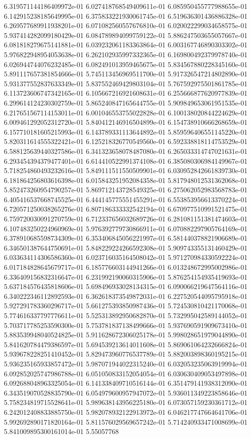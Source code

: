 	6.319571144186409972e-01	6.027418768549409611e-01	6.085950455777988655e-01	6.142915238185649995e-01	6.375833221930061745e-01	6.519636301436886328e-01	6.269577689911938201e-01	6.071082560557676810e-01	6.020022299034658575e-01	5.937414282099180429e-01	6.084789894099759122e-01	5.886247503655057667e-01	6.081818279675141881e-01	6.039232061183363864e-01	6.003167746890303302e-01	5.976822948954053638e-01	6.262102935997332365e-01	6.169800492379978740e-01	6.026944744076232485e-01	6.082491013959465675e-01	5.834567880228345160e-01	5.891117657381854666e-01	5.745113456969511700e-01	5.917326547214802890e-01	5.931377552837633349e-01	5.837552469429803104e-01	5.767592975501861785e-01	6.113723606747342165e-01	6.105667216921608631e-01	6.255666877620977839e-01	6.299614124230302759e-01	5.865240847165644755e-01	5.909849653061951535e-01	6.217651567114153011e-01	6.001046553755022828e-01	6.100138020844224629e-01	6.009461292052312720e-01	5.840412146916504899e-01	6.154738910666268659e-01	6.157710181605215993e-01	6.143789331113644892e-01	5.859596406551145220e-01	5.820311614555322421e-01	6.125218326770549560e-01	6.592338818114753529e-01	6.588125639440327586e-01	6.341323658078487080e-01	6.265033314747021631e-01	6.293454394379477401e-01	6.614410522991374108e-01	6.385080306984149967e-01	5.718254860493232616e-01	5.849111511550509901e-01	6.030952842661839730e-01	6.181864256803616398e-01	6.015843251952084358e-01	5.817948012531362068e-01	5.852473260954790257e-01	5.869712143728549325e-01	6.275062052983568783e-01	6.405416537668745525e-01	6.444145775551455291e-01	6.553853956613370224e-01	6.720571250038265276e-01	6.807186333332542194e-01	6.670977510991521475e-01	6.759720030091270759e-01	6.712337656032689726e-01	6.281081151381474603e-01	6.107483250224960969e-01	5.976392779730866911e-01	6.070882297905764169e-01	6.378910685598734309e-01	6.353406845056221997e-01	6.581440378821906689e-01	6.346501387644750691e-01	5.848229224266592308e-01	5.909743355131460429e-01	6.033634114306586360e-01	6.023716035164508042e-01	5.971270984330592224e-01	6.017184828645679717e-01	6.185776603144941266e-01	6.013248672995002986e-01	6.336409156832316647e-01	6.231992190060315906e-01	5.876254154935419693e-01	5.637184576435818606e-01	5.698496933028134315e-01	6.090066219647564116e-01	6.340222346112892593e-01	6.362618373549872031e-01	6.227520544095795918e-01	5.927291783360296717e-01	5.661275393850987436e-01	5.724530810421170068e-01	5.774616337797776611e-01	5.525313892950682870e-01	5.732995042589144052e-01	5.703717785253590300e-01	5.753781837138499666e-01	5.937690591909673410e-01	5.883539948040524825e-01	5.911628672306025178e-01	5.998028651979044890e-01	5.841620784479386597e-01	5.694539213614011608e-01	5.869061064232666824e-01	5.939678228251410452e-01	5.829473960776537789e-01	5.882003898360195215e-01	5.936235165933857472e-01	5.987071944022315240e-01	6.032053235063919994e-01	6.092852025747986788e-01	6.051050833152054054e-01	6.030630409053497898e-01	6.092688048963325054e-01	6.141338409710516144e-01	6.351479141938312090e-01	6.343519070528835790e-01	6.054979600957947072e-01	5.936011349223858646e-01	5.758234819715528641e-01	5.989638143956225180e-01	6.073057159230361712e-01	6.242012408833885750e-01	5.982078932122913972e-01	6.046217747664641706e-01	5.992692890171820164e-01	5.811576029569657242e-01	5.714240933471008699e-01	5.841009895300161014e-01	5.55057768